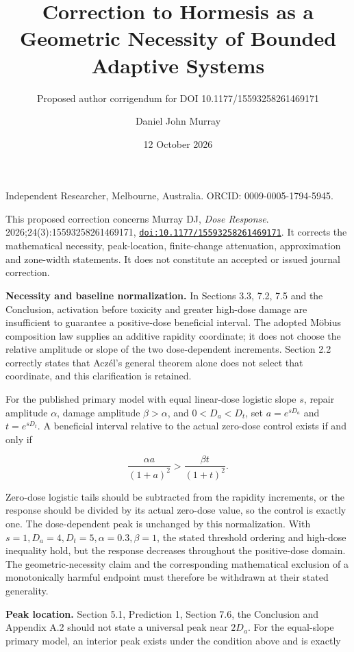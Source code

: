 \documentclass[
  11pt,
  a4paper,
]{article}
\title{Correction to Hormesis as a Geometric Necessity of Bounded Adaptive Systems}
\subtitle{Proposed author corrigendum for DOI 10.1177/15593258261469171}
\author{Daniel John Murray}
\date{12 October 2026}
\begin{document}
\maketitle

Independent Researcher, Melbourne, Australia. ORCID: 0009-0005-1794-5945.

This proposed correction concerns Murray DJ, \emph{Dose Response}. 2026;24(3):15593258261469171, \href{https://doi.org/10.1177/15593258261469171}{\nolinkurl{doi:10.1177/15593258261469171}}. It corrects the mathematical necessity, peak-location, finite-change attenuation, approximation and zone-width statements. It does not constitute an accepted or issued journal correction.

\textbf{Necessity and baseline normalization.} In Sections 3.3, 7.2, 7.5 and the Conclusion, activation before toxicity and greater high-dose damage are insufficient to guarantee a positive-dose beneficial interval. The adopted Möbius composition law supplies an additive rapidity coordinate; it does not choose the relative amplitude or slope of the two dose-dependent increments. Section 2.2 correctly states that Aczél's general theorem alone does not select that coordinate, and this clarification is retained.

For the published primary model with equal linear-dose logistic slope \(s\), repair amplitude \(\alpha\), damage amplitude \(\beta>\alpha\), and \(0<D_a<D_t\), set \(a=e^{sD_a}\) and \(t=e^{sD_t}\). A beneficial interval relative to the actual zero-dose control exists if and only if

\[\frac{\alpha a}{(1+a)^2}>\frac{\beta t}{(1+t)^2}.\]

Zero-dose logistic tails should be subtracted from the rapidity increments, or the response should be divided by its actual zero-dose value, so the control is exactly one. The dose-dependent peak is unchanged by this normalization. With \(s=1,D_a=4,D_t=5,\alpha=0.3,\beta=1\), the stated threshold ordering and high-dose inequality hold, but the response decreases throughout the positive-dose domain. The geometric-necessity claim and the corresponding mathematical exclusion of a monotonically harmful endpoint must therefore be withdrawn at their stated generality.

\textbf{Peak location.} Section 5.1, Prediction 1, Section 7.6, the Conclusion and Appendix A.2 should not state a universal peak near \(2D_a\). For the equal-slope primary model, an interior peak exists under the condition above and is exactly
\end{document}
